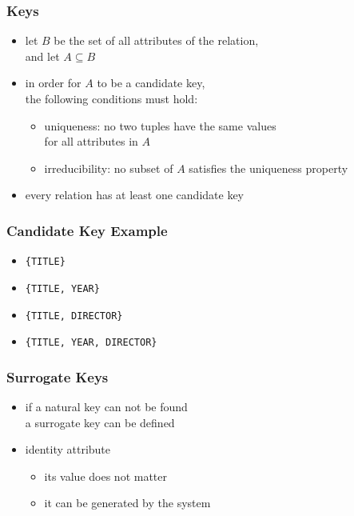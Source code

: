 \documentclass[dvipsnames]{beamer}
\theoremstyle{plain}
\begin{document}
\begin{frame}
  \frametitle{Keys}

  \begin{itemize}
    \item let $B$ be the set of all attributes of the relation,\\
      and let $A \subseteq B$ 

    \item in order for $A$ to be a candidate key,\\
      the following conditions must hold:

    \pause
    \begin{itemize}
      \item \alert{uniqueness}: no two tuples have the same values\\
        for all attributes in $A$

      \pause
      \item \alert{irreducibility}: no subset of $A$ satisfies the uniqueness
        property
    \end{itemize}

    \pause
    \item every relation has at least one candidate key
  \end{itemize}
\end{frame}

\begin{frame}
  \frametitle{Candidate Key Example}

  \begin{example}
    \begin{itemize}
      \item \texttt{\{TITLE\}}

      \pause
      \item \texttt{\{TITLE, YEAR\}}

      \pause
      \item \texttt{\{TITLE, DIRECTOR\}}

      \pause
      \item \texttt{\{TITLE, YEAR, DIRECTOR\}}
    \end{itemize}
  \end{example}
\end{frame}

\begin{frame}
  \frametitle{Surrogate Keys}

  \begin{itemize}
    \item if a \alert{natural key} can not be found\\
      a \alert{surrogate key} can be defined

    \pause
    \medskip
    \item identity attribute
    \begin{itemize}
      \item its value does not matter
      \item it can be generated by the system
    \end{itemize}
  \end{itemize}
\end{frame}
\end{document}
